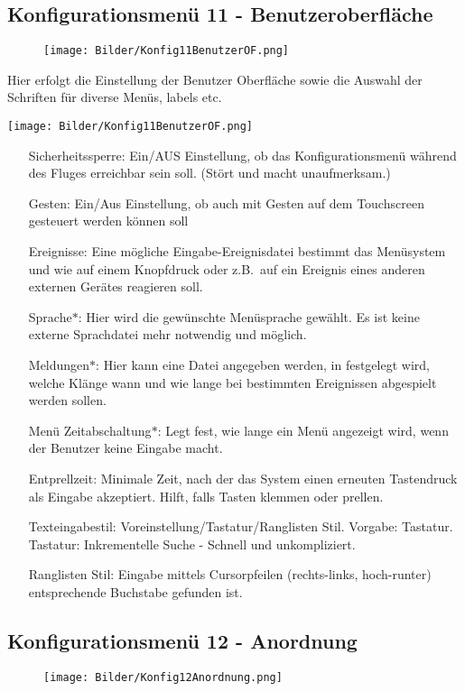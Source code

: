 \subsection{Konfigurationsmenü 11 - Benutzeroberfläche}\label{Konfig11}
\begin{wrapfigure}{r}{5.2cm}
\texttt{[image: Bilder/Konfig11BenutzerOF.png]}
\end{wrapfigure}
Hier erfolgt die Einstellung der Benutzer Oberfläche sowie die Auswahl der Schriften für diverse Menüs, labels etc.\
\begin{center}
\texttt{[image: Bilder/Konfig11BenutzerOF.png]}
\end{center}
\begin{enumerate}
\item[Sicherheitssperre:]  Ein/AUS
Einstellung, ob das Konfigurationsmenü während des Fluges  erreichbar sein soll. (Stört und macht unaufmerksam.)
\item[Gesten:] Ein/Aus
Einstellung, ob \xc auch mit Gesten auf dem Touchscreen gesteuert werden können soll
\item[Ereignisse:] Eine mögliche Eingabe-Ereignisdatei bestimmt das Menüsystem und wie \xc auf einem Knopfdruck oder z.B.\ auf ein Ereignis eines anderen externen Gerätes reagieren soll.
\item[Sprache$\ast$:] Hier wird die gewünschte Menüsprache gewählt. Es ist keine externe Sprachdatei mehr notwendig und möglich.
\item[Meldungen$\ast$:] Hier kann eine Datei angegeben werden, in festgelegt wird, welche Klänge wann und wie lange bei bestimmten Ereignissen abgespielt werden sollen.
\item[Menü Zeitabschaltung$\ast$:] Legt fest, wie lange ein Menü angezeigt wird, wenn der Benutzer keine Eingabe macht.
\item[Entprellzeit:]Minimale Zeit, nach der das System einen erneuten Tastendruck als Eingabe akzeptiert. Hilft, falls Tasten klemmen oder prellen.
\item[Texteingabestil:] Voreinstellung/Tastatur/Ranglisten Stil.
Vorgabe: Tastatur.\\
Tastatur: Inkrementelle Suche - Schnell und unkompliziert.

Ranglisten Stil: Eingabe mittels Cursorpfeilen (rechts-links, hoch-runter) entsprechende Buchstabe gefunden ist.
\end{enumerate}



\subsection{Konfigurationsmenü 12 - Anordnung}\label{Konfig12}
\begin{wrapfigure}{r}{5.2cm}
\texttt{[image: Bilder/Konfig12Anordnung.png]}
\end{wrapfigure}

